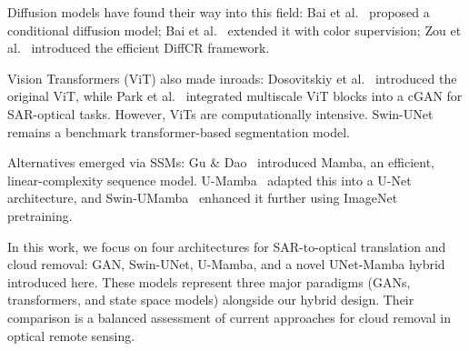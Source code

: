 Diffusion models have found their way into this field: Bai et al.~\cite{bai2023} proposed a conditional diffusion model; Bai et al.~\cite{bai2024} extended it with color supervision; Zou et al.~\cite{zou2023} introduced the efficient DiffCR framework.

Vision Transformers (ViT) also made inroads: Dosovitskiy et al.~\cite{dosovitskiy2020} introduced the original ViT, while Park et al.~\cite{park2025} integrated multiscale ViT blocks into a cGAN for SAR-optical tasks. However, ViTs are computationally intensive. Swin-UNet~\cite{swinunet2023} remains a benchmark transformer-based segmentation model. 

Alternatives emerged via SSMs: Gu \& Dao~\cite{gu2023} introduced Mamba, an efficient, linear-complexity sequence model. U-Mamba~\cite{umamba2024} adapted this into a U-Net architecture, and Swin-UMamba~\cite{swinumamba2024} enhanced it further using ImageNet pretraining.

In this work, we focus on four architectures for SAR-to-optical translation and cloud removal: GAN, Swin-UNet, U-Mamba, and a novel UNet-Mamba hybrid introduced here. These models represent three major paradigms (GANs, transformers, and state space models) alongside our hybrid design. Their comparison is a balanced assessment of current approaches for cloud removal in optical remote sensing.
